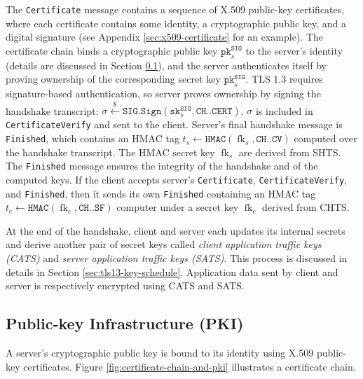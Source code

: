 \documentclass[letterpaper,12pt,titlepage,oneside,final]{book}
\newcommand{\pk}{\texttt{pk}}
\newcommand{\sk}{\texttt{sk}}
\newcommand{\leftsample}{\stackrel{\$}{\leftarrow}}
\newcommand{\sig}{{\texttt{SIG}}}
\begin{document}
The \texttt{Certificate} message contains a sequence of X.509 public-key certificates, where each certificate contains some identity, a cryptographic public key, and a digital signature (see Appendix \ref{sec:x509-certificate} for an example).
The certificate chain binds a cryptographic public key $\pk^\sig_s$ to the server's identity (details are discussed in Section \ref{sec:public-key-infrastructure}), and the server authenticates itself by proving ownership of the corresponding secret key $\pk^\sig_s$.
TLS 1.3 requires signature-based authentication, so server proves ownership by signing the handshake transcript: $\sigma \leftsample \texttt{SIG.Sign}(\sk^\sig_s, \texttt{CH..CERT})$.
$\sigma$ is included in \texttt{CertificateVerify} and sent to the client.
Server's final handshake message is \texttt{Finished}, which contains an HMAC tag $t_s \leftarrow \texttt{HMAC}(\operatorname{fk}_s, \texttt{CH..CV})$ computed over the handshake transcript.
The HMAC secret key $\operatorname{fk}_s$ are derived from SHTS.
The \texttt{Finished} message ensures the integrity of the handshake and of the computed keys.
If the client accepts server's \texttt{Certificate}, \texttt{CertificateVerify}, and \texttt{Finished}, then it sends its own \texttt{Finished} containing an HMAC tag $t_c\leftarrow\texttt{HMAC}(\operatorname{fk}_c, \texttt{CH..SF})$ computer under a secret key $\operatorname{fk}_c$ derived from CHTS.

At the end of the handshake, client and server each updates its internal secrets and derive another pair of secret keys called \emph{client application traffic keys (CATS)} and \emph{server application traffic keys (SATS)}.
This process is discussed in details in Section \ref{sec:tls13-key-schedule}.
Application data sent by client and server is respectively encrypted using CATS and SATS.

\subsection{Public-key Infrastructure (PKI)}\label{sec:public-key-infrastructure}
A server's cryptographic public key is bound to its identity using X.509 public-key certificates. Figure \ref{fig:certificate-chain-and-pki} illustrates a certificate chain.
\end{document}
